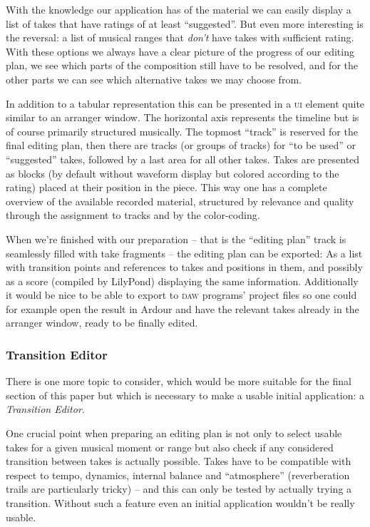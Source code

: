\documentclass[11pt,a4paper]{article}
\begin{document}
With the knowledge our application has of the material we can easily display a list of takes that have ratings of at least “suggested”.
But even more interesting is the reversal: a list of musical ranges that \emph{don't} have takes with sufficient rating.
With these options we always have a clear picture of the progress of our editing plan, we see which parts of the composition still have to be resolved, and for the other parts we can see which alternative takes we may choose from.

In addition to a tabular representation this can be presented in a \textsc{ui} element quite similar to an arranger window.
The horizontal axis represents the timeline but is of course primarily structured musically.
The topmost “track” is reserved for the final editing plan, then there are tracks (or groups of tracks) for “to be used” or “suggested” takes, followed by a last area for all other takes.
Takes are presented as blocks (by default without waveform display but colored according to the rating) placed at their position in the piece.
This way one has a complete overview of the available recorded material, structured by relevance and quality through the assignment to tracks and by the color-coding.

When we're finished with our preparation -- that is the “editing plan” track is seamlessly filled with take fragments -- the editing plan can be exported: As a list with transition points and references to takes and positions in them, and possibly as a score (compiled by LilyPond) displaying the same information.
Additionally it would be nice to be able to export to \textsc{daw} programs' project files so one could for example open the result in Ardour and have the relevant takes already in the arranger window, ready to be finally edited.

\subsubsection{Transition Editor}
There is one more topic to consider, which would be more suitable for the final section of this paper but which is necessary to make a usable initial application: a \emph{Transition Editor}.

One crucial point when preparing an editing plan is not only to select usable takes for a given musical moment or range but also check if any considered transition between takes is actually possible.
Takes have to be compatible with respect to tempo, dynamics, internal balance and “atmosphere” (reverberation trails are particularly tricky) -- and this can only be tested by actually trying a transition.
Without such a feature even an initial application wouldn't be really usable.
\end{document}

